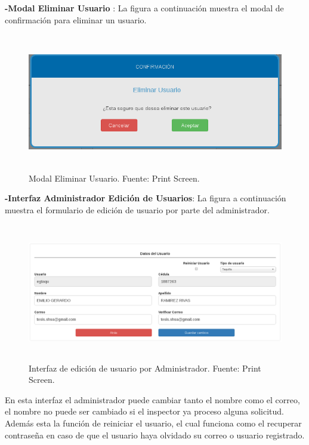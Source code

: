 \textbf{-Modal Eliminar Usuario }: La figura a continuación muestra el modal de confirmación para eliminar un usuario.

\begin{figure}[H]
\begin{center}
	\includegraphics[width=14cm,height=6cm]{img/interfaces/modal_eliminar_usuario.png}
\end{center}
\caption{Modal Eliminar Usuario. Fuente: Print Screen.}
\label{fig:modal_confirmacion_eliminar_usuario}
\end{figure}


\textbf{-Interfaz Administrador Edición de Usuarios}: La figura a continuación muestra el formulario de edición de usuario por parte del administrador.

\begin{figure}[H]
\begin{center}
	\includegraphics[width=\textwidth,height=6cm]{img/interfaces/editar_usuario_admin.png}
\end{center}
\caption{Interfaz de edición de usuario por Administrador. Fuente: Print Screen.}
\label{fig:interfaz_edicion_usuario_administrador}
\end{figure}

En esta interfaz el administrador puede cambiar tanto el nombre como el correo, el nombre no puede ser cambiado si el inspector ya proceso alguna solicitud. Además esta la función de reiniciar el usuario, el cual funciona como el recuperar contraseña en caso de que el usuario haya olvidado su correo o usuario registrado.



